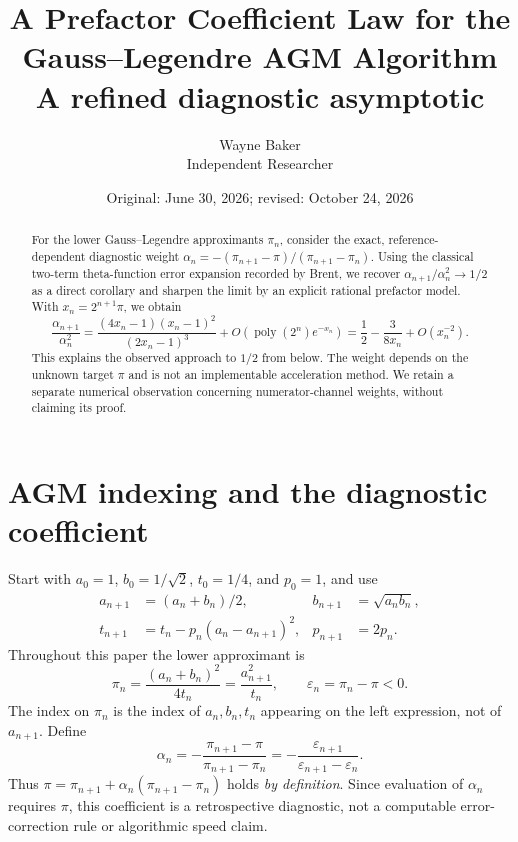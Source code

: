 \documentclass[11pt]{article}
\title{A Prefactor Coefficient Law for the Gauss--Legendre AGM Algorithm\\\large A refined diagnostic asymptotic}
\author{Wayne Baker\\\small Independent Researcher}
\date{Original: June 30, 2026; revised: October 24, 2026}
\theoremstyle{definition}\newtheorem{remark}{Remark}\newtheorem{observation}{Numerical Observation}
\begin{document}
\maketitle
\begin{abstract}
For the lower Gauss--Legendre approximants $\pi_n$, consider the exact, reference-dependent diagnostic weight
$\alpha_n=-(\pi_{n+1}-\pi)/(\pi_{n+1}-\pi_n)$. Using the classical two-term theta-function error expansion recorded by Brent, we recover $\alpha_{n+1}/\alpha_n^2\to1/2$ as a direct corollary and sharpen the limit by an explicit rational prefactor model. With $x_n=2^{n+1}\pi$, we obtain
\[
\frac{\alpha_{n+1}}{\alpha_n^2}
=\frac{(4x_n-1)(x_n-1)^2}{(2x_n-1)^3}
+O(\operatorname{poly}(2^n)e^{-x_n})
=\frac12-\frac{3}{8x_n}+O(x_n^{-2}).
\]
This explains the observed approach to $1/2$ from below. The weight depends on the unknown target $\pi$ and is not an implementable acceleration method. We retain a separate numerical observation concerning numerator-channel weights, without claiming its proof.
\end{abstract}
\section{AGM indexing and the diagnostic coefficient}
Start with $a_0=1$, $b_0=1/\sqrt2$, $t_0=1/4$, and $p_0=1$, and use
\[
\begin{aligned}
a_{n+1}&=(a_n+b_n)/2,&b_{n+1}&=\sqrt{a_nb_n},\\
t_{n+1}&=t_n-p_n(a_n-a_{n+1})^2,&p_{n+1}&=2p_n.
\end{aligned}
\]
Throughout this paper the lower approximant is
\[
\pi_n=\frac{(a_n+b_n)^2}{4t_n}=\frac{a_{n+1}^2}{t_n},\qquad
\varepsilon_n=\pi_n-\pi<0.
\]
The index on $\pi_n$ is the index of $a_n,b_n,t_n$ appearing on the left expression, not of $a_{n+1}$. Define
\[
\alpha_n=-\frac{\pi_{n+1}-\pi}{\pi_{n+1}-\pi_n}
=-\frac{\varepsilon_{n+1}}{\varepsilon_{n+1}-\varepsilon_n}.
\]
Thus $\pi=\pi_{n+1}+\alpha_n(\pi_{n+1}-\pi_n)$ holds \emph{by definition}. Since evaluation of $\alpha_n$ requires $\pi$, this coefficient is a retrospective diagnostic, not a computable error-correction rule or algorithmic speed claim.
\end{document}
